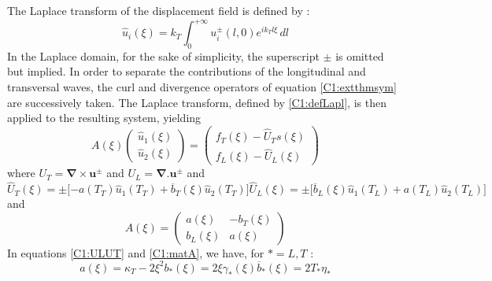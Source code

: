 The Laplace transform of the displacement field is defined by :
\begin{equation}
\hat{u}_i(\xi)=k_T\int_0^{+\infty}u_i^\pm(l,0)e^{ik_Tl\xi}\, dl
\label{C1:defLapl}
\end{equation}
In the Laplace domain, for the sake of simplicity, the superscript $\pm$ is omitted but implied. In order to separate the contributions of the longitudinal and transversal waves, the curl and divergence operators of equation \eqref{C1:extthmsym} are successively taken. The Laplace transform, defined by \eqref{C1:defLapl}, is then applied to the resulting system, yielding
\begin{equation}
A(\xi)\begin{pmatrix}
\hat{u}_1(\xi)\\
\hat{u}_2(\xi)
\end{pmatrix}
= \begin{pmatrix}
f_T(\xi)-\hat{U}_Ts(\xi)\\
f_L(\xi)-\hat{U}_L(\xi)
\end{pmatrix}
\label{C1:LTsyst}
\end{equation}
where $U_T=\mathbf{\nabla}\times\mathbf{u}^\pm$ and $U_L=\mathbf{\nabla}.\mathbf{u}^\pm$ and 
\begin{subequations}
\begin{equation}
\hat{U}_T(\xi)=\pm\lbrack -a(T_T)\hat{u}_1(T_T)+\overline{b}_T(\xi)\hat{u}_2(T_T) \rbrack
\end{equation}
\begin{equation}
\hat{U}_L(\xi)=\pm\lbrack \overline{b}_L(\xi)\hat{u}_1(T_L)+a(T_L)\hat{u}_2(T_L) \rbrack
\end{equation}
\label{C1:ULUT}
\end{subequations}
and
\begin{equation}
A(\xi)=\begin{pmatrix}
a(\xi)&-b_T(\xi)\\
b_L(\xi)&a(\xi)
\end{pmatrix}
\label{C1:matA}
\end{equation}
In equations \eqref{C1:ULUT} and \eqref{C1:matA}, we have, for $*=L,T$ :
\begin{subequations}
\begin{equation}
a(\xi)=\kappa_T-2\xi^2
\end{equation}
\begin{equation}
b_*(\xi)=2\xi\gamma_*(\xi)
\end{equation}
\begin{equation}
\overline{b}_*(\xi)=2T_*\eta_*
\end{equation}
\end{subequations}

